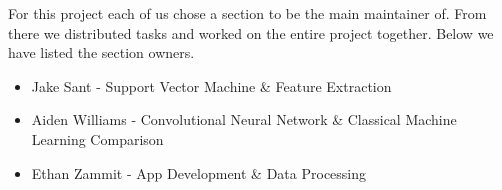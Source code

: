 For this project each of us chose a section to be the main maintainer of.
From there we distributed tasks and worked on the entire project together.
Below we have listed the section owners.

\begin{itemize}

    \item Jake Sant - Support Vector Machine \& Feature Extraction

    \item Aiden Williams - Convolutional Neural Network \&  Classical Machine Learning Comparison

    \item Ethan Zammit - App Development \& Data Processing

\end{itemize}